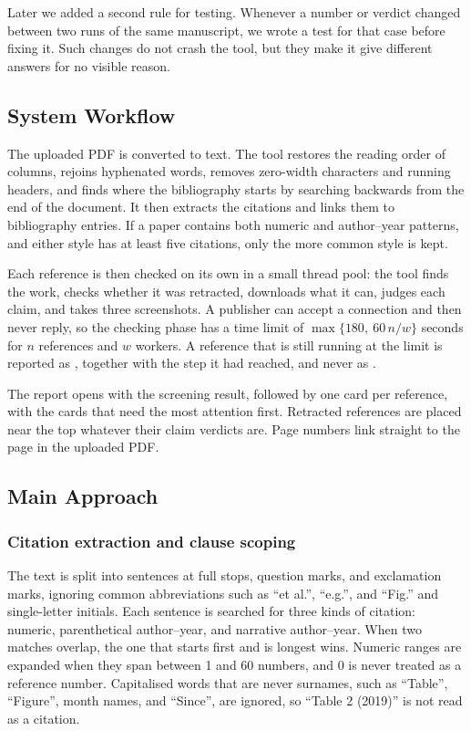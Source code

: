 \documentclass{article}
\newcommand{\vd}[1]{\texttt{\detokenize{#1}}}
\begin{document}
Later we added a second rule for testing. Whenever a number or verdict changed between two runs of the same manuscript, we wrote a test for that case before fixing it. Such changes do not crash the tool, but they make it give different answers for no visible reason.

\subsection{System Workflow}

The uploaded PDF is converted to text. The tool restores the reading order of columns, rejoins hyphenated words, removes zero-width characters and running headers, and finds where the bibliography starts by searching backwards from the end of the document. It then extracts the citations and links them to bibliography entries. If a paper contains both numeric and author--year patterns, and either style has at least five citations, only the more common style is kept.

Each reference is then checked on its own in a small thread pool: the tool finds the work, checks whether it was retracted, downloads what it can, judges each claim, and takes three screenshots. A publisher can accept a connection and then never reply, so the checking phase has a time limit of $\max\{180,\ 60\,n/w\}$ seconds for $n$ references and $w$ workers. A reference that is still running at the limit is reported as \vd{unverified}, together with the step it had reached, and never as \vd{not_found}.

The report opens with the screening result, followed by one card per reference, with the cards that need the most attention first. Retracted references are placed near the top whatever their claim verdicts are. Page numbers link straight to the page in the uploaded PDF.

\subsection{Main Approach}

\subsubsection{Citation extraction and clause scoping}
\label{sec:extraction}

The text is split into sentences at full stops, question marks, and exclamation marks, ignoring common abbreviations such as ``et al.'', ``e.g.'', and ``Fig.'' and single-letter initials. Each sentence is searched for three kinds of citation: numeric, parenthetical author--year, and narrative author--year. When two matches overlap, the one that starts first and is longest wins. Numeric ranges are expanded when they span between 1 and 60 numbers, and 0 is never treated as a reference number. Capitalised words that are never surnames, such as ``Table'', ``Figure'', month names, and ``Since'', are ignored, so ``Table 2 (2019)'' is not read as a citation.
\end{document}
